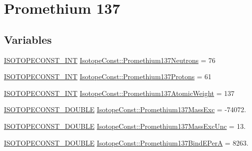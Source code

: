 \hypertarget{group___isotope_const-_promethium-_pm137}{}\section{Promethium 137}
\label{group___isotope_const-_promethium-_pm137}
\subsection*{Variables}
\begin{DoxyCompactItemize}
\item 
\mbox{\hyperlink{group___isotope_const-_macros_ga5f18360b3e99483a35c32d789e62621c}{I\+S\+O\+T\+O\+P\+E\+C\+O\+N\+S\+T\+\_\+\+I\+NT}} \mbox{\hyperlink{group___isotope_const-_promethium-_pm137_gaf31e7d6da13536f6bc7d712ca8cf61bd}{Isotope\+Const\+::\+Promethium137\+Neutrons}} = 76
\item 
\mbox{\hyperlink{group___isotope_const-_macros_ga5f18360b3e99483a35c32d789e62621c}{I\+S\+O\+T\+O\+P\+E\+C\+O\+N\+S\+T\+\_\+\+I\+NT}} \mbox{\hyperlink{group___isotope_const-_promethium-_pm137_ga1f09423a0a9f807e825cf4daca98e8cd}{Isotope\+Const\+::\+Promethium137\+Protons}} = 61
\item 
\mbox{\hyperlink{group___isotope_const-_macros_ga5f18360b3e99483a35c32d789e62621c}{I\+S\+O\+T\+O\+P\+E\+C\+O\+N\+S\+T\+\_\+\+I\+NT}} \mbox{\hyperlink{group___isotope_const-_promethium-_pm137_gaa99f44734d79ef3da8653b7e9a9aa0cb}{Isotope\+Const\+::\+Promethium137\+Atomic\+Weight}} = 137
\item 
\mbox{\hyperlink{group___isotope_const-_macros_ga8f45a7272ce02c0b4c65c44636ed719a}{I\+S\+O\+T\+O\+P\+E\+C\+O\+N\+S\+T\+\_\+\+D\+O\+U\+B\+LE}} \mbox{\hyperlink{group___isotope_const-_promethium-_pm137_gac082ec70653d9fb353a7e02b0d423b51}{Isotope\+Const\+::\+Promethium137\+Mass\+Exc}} = -\/74072.
\item 
\mbox{\hyperlink{group___isotope_const-_macros_ga8f45a7272ce02c0b4c65c44636ed719a}{I\+S\+O\+T\+O\+P\+E\+C\+O\+N\+S\+T\+\_\+\+D\+O\+U\+B\+LE}} \mbox{\hyperlink{group___isotope_const-_promethium-_pm137_ga842ea49569f34d89c58ec6458dba405b}{Isotope\+Const\+::\+Promethium137\+Mass\+Exc\+Unc}} = 13.
\item 
\mbox{\hyperlink{group___isotope_const-_macros_ga8f45a7272ce02c0b4c65c44636ed719a}{I\+S\+O\+T\+O\+P\+E\+C\+O\+N\+S\+T\+\_\+\+D\+O\+U\+B\+LE}} \mbox{\hyperlink{group___isotope_const-_promethium-_pm137_gab3c65974c363cc713df75f24c4d9e0f3}{Isotope\+Const\+::\+Promethium137\+Bind\+E\+PerA}} = 8263.

\end{DoxyCompactItemize}
